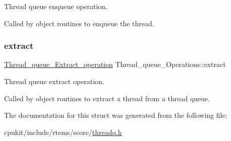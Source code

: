 Thread queue enqueue operation. 

Called by object routines to enqueue the thread. \mbox{\label{structThread__queue__Operations_aca951f26ce2d2d3be6f62c3c882c1541}} 
\subsubsection{\texorpdfstring{extract}{extract}}
{\footnotesize\ttfamily \mbox{\hyperlink{group__RTEMSScoreThreadQueue_ga7fdee2ebb4fe9f9dae612be0ecce85db}{Thread\+\_\+queue\+\_\+\+Extract\+\_\+operation}} Thread\+\_\+queue\+\_\+\+Operations\+::extract}



Thread queue extract operation. 

Called by object routines to extract a thread from a thread queue. 

The documentation for this struct was generated from the following file\+:\begin{DoxyCompactItemize}
\item 
cpukit/include/rtems/score/\mbox{\hyperlink{threadq_8h}{threadq.\+h}}\end{DoxyCompactItemize}

